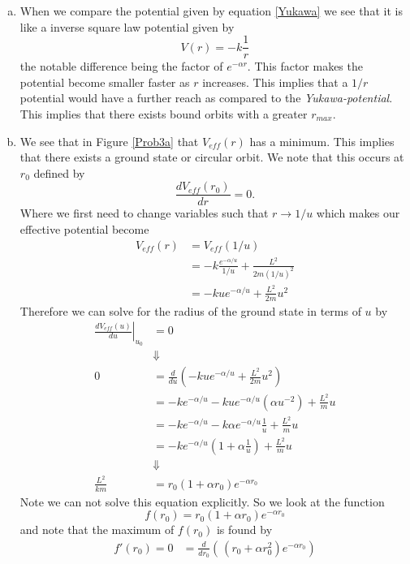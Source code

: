 \documentclass[11pt]{article}
\numberwithin{equation}{section}
\begin{document}
\begin{enumerate}[(a)]
\item When we compare the potential given by equation \ref{Yukawa} we see that it is like a
inverse square law potential given by
$$V(r) = -k\frac{1}{r}$$
the notable difference being the factor of $e^{-\alpha r}$. This factor makes the potential
become smaller faster as $r$ increases. This implies that a $1/r$ potential would have a 
further reach as compared to the \emph{Yukawa-potential}. This implies that there exists 
bound orbits with a greater $r_{max}$.

\item We see that in Figure \ref{Prob3a} that $V_{eff}(r)$ has a minimum. This implies that 
there exists a ground state or circular orbit. We note that this occurs at $r_0$ defined by
\begin{equation}
\frac{dV_{eff}(r_0)}{dr} = 0.
\label{CircOrb}
\end{equation}
Where we first need to change variables such that $r\rightarrow1/u$ which makes our 
effective potential become
\begin{align*}
V_{eff}(r) &= V_{eff}(1/u)\\
&= -k\frac{e^{-\alpha/u }}{1/u} + \frac{L^2}{2m(1/u)^2}\\
&= -kue^{-\alpha/u}+ \frac{L^2}{2m}u^2
\end{align*}
Therefore we can solve for the radius of the ground state in terms of $u$ by
\begin{align*}
\left.\frac{dV_{eff}(u)}{du}\right|_{u_0} &= 0\\
&\Downarrow\\
0 &= \frac{d}{du}\left(-kue^{-\alpha/u} + \frac{L^2}{2m}u^2\right)\\
&= -ke^{-\alpha/u} -kue^{-\alpha/u}\left(\alpha u^{-2}\right) + \frac{L^2}{m}u\\
&= -ke^{-\alpha/u} -k\alpha e^{-\alpha/u}\frac{1}{u} + \frac{L^2}{m}u\\
&= -ke^{-\alpha/u}\left(1 + \alpha\frac{1}{u}\right) + \frac{L^2}{m}u\\
&\Downarrow\\
\frac{L^2}{km} &= r_0\left(1 + \alpha r_0\right)e^{-\alpha r_0}
\end{align*}
Note we can not solve this equation explicitly. So we look at the function
$$f(r_0) =  r_0\left(1 + \alpha r_0\right)e^{-\alpha r_0}$$
and note that the maximum of $f(r_0)$ is found by
\begin{align*}
f'(r_0) = 0 &=  \frac{d}{dr_0}\left(\frac{}{}\left(r_0 + \alpha r_0^2\right)e^{-\alpha r_0}\right)\\

\end{align*}
\end{enumerate}
\end{document}

